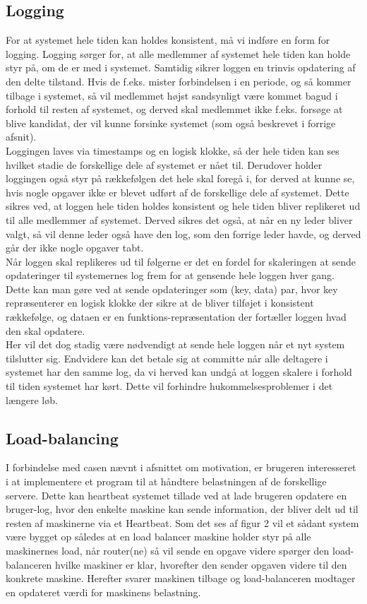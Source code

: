 \documentclass[a4paper,12pt]{article}
\begin{document}
\subsection{Logging}
For at systemet hele tiden kan holdes konsistent, må vi indføre en form for logging. Logging sørger for, at alle medlemmer af systemet hele tiden kan holde styr på, om de er med i systemet. Samtidig sikrer loggen en trinvis opdatering af den delte tilstand. Hvis de f.eks. mister forbindelsen i en periode, og så kommer tilbage i systemet, så vil medlemmet højst sandsynligt være kommet bagud i forhold til resten af systemet, og derved skal medlemmet ikke f.eks. forsøge at blive kandidat, der vil kunne forsinke systemet (som også beskrevet i forrige afsnit). 
\\
Loggingen laves via timestamps og en logisk klokke, så der hele tiden kan ses hvilket stadie de forskellige dele af systemet er nået til. Derudover holder loggingen også styr på rækkefølgen det hele skal foregå i, for derved at kunne se, hvis nogle opgaver ikke er blevet udført af de forskellige dele af systemet. Dette sikres ved, at loggen hele tiden holdes konsistent og hele tiden bliver replikeret ud til alle medlemmer af systemet. Derved sikres det også, at når en ny leder bliver valgt, så vil denne leder også have den log, som den forrige leder havde, og derved går der ikke nogle opgaver tabt.
\\[5px]
Når loggen skal replikeres ud til følgerne er det en fordel for skaleringen at sende opdateringer til systemernes log frem for at gensende hele loggen hver gang.
Dette kan man gøre ved at sende opdateringer som (key, data) par, hvor key repræsenterer en logisk klokke der sikre at de bliver tilføjet i konsistent rækkefølge, og dataen er en funktions-repræsentation der fortæller loggen hvad den skal opdatere.
\\
Her vil det dog stadig være nødvendigt at sende hele loggen når et nyt system tilslutter sig. Endvidere kan det betale sig at committe når alle deltagere i systemet har den samme log, da vi herved kan undgå at loggen skalere i forhold til tiden systemet har kørt. Dette vil forhindre hukommelsesproblemer i det længere løb.


\subsection{Load-balancing}
I forbindelse med casen nævnt i afsnittet om motivation, er brugeren interesseret i at implementere et program til at håndtere belastningen af de forskellige servere. Dette kan heartbeat systemet tillade ved at lade brugeren opdatere en bruger-log, hvor den enkelte maskine kan sende information, der bliver delt ud til resten af maskinerne via et Heartbeat. Som det ses af figur 2 vil et sådant system være bygget op således at en load balancer maskine holder styr på alle maskinernes load, når router(ne) så vil sende en opgave videre spørger den load-balanceren hvilke maskiner er klar, hvorefter den sender opgaven videre til den konkrete maskine.
Herefter svarer maskinen tilbage og load-balanceren modtager en opdateret værdi for maskinens belastning.
\end{document}
